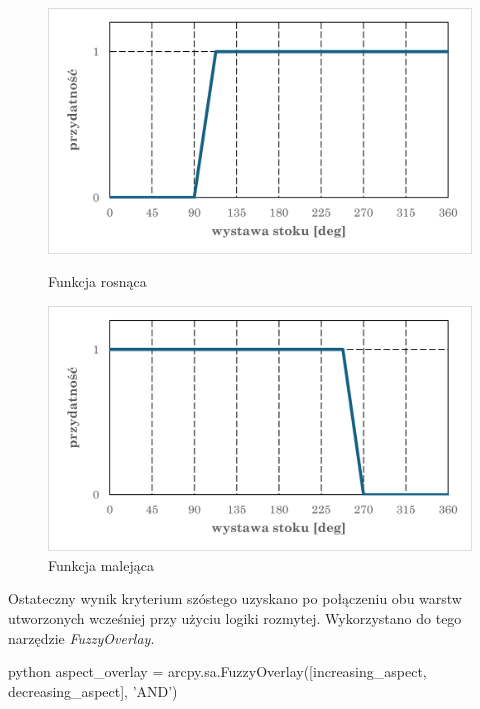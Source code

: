 \documentclass{article}
\begin{document}
\begin{figure}[H]
    \centering
    \begin{minipage}{0.48\textwidth}
        \centering
        \includegraphics[width=\linewidth]{img/kryterium6-wykres-pierwszy.png}
        \caption{Funkcja rosnąca}
    \end{minipage}
    \begin{minipage}{0.48\textwidth}
        \centering
        \includegraphics[width=\linewidth]{img/kryterium6-wykres-drugi.png}
        \caption{Funkcja malejąca}
    \end{minipage}
\end{figure}
\vspace{10pt}

Ostateczny wynik kryterium szóstego uzyskano po połączeniu obu warstw utworzonych wcześniej przy użyciu logiki rozmytej. Wykorzystano do tego narzędzie \textit{FuzzyOverlay}.
\vspace{5pt}

\begin{mintedbox}{python}
aspect_overlay = arcpy.sa.FuzzyOverlay([increasing_aspect, decreasing_aspect], 'AND')
\end{mintedbox}
\vspace{5pt}
\end{document}
